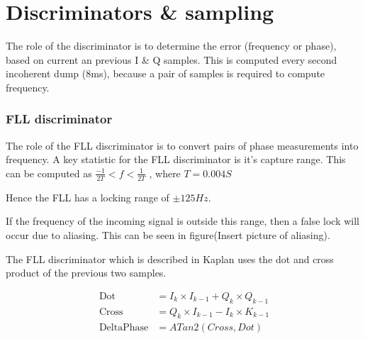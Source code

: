 \chapter{Discriminators \& sampling}
\label{ch:Discriminators}

The role of the discriminator is to determine the error (frequency or phase), based on current an previous I \& Q samples. This is computed every second incoherent dump (8ms), because a pair of samples is required to compute frequency. 







\subsection{FLL discriminator}
The role of the FLL discriminator is to convert pairs of phase measurements into frequency. A key statistic for the FLL discriminator is it's capture range. This can be computed as 
$\frac{-1}{2T} < f < \frac{1}{2T}$
, where $T = 0.004S$

Hence the FLL has a locking range of $\pm 125Hz$. 

If the frequency of the incoming signal is outside this range, then a false lock will occur due to aliasing. This can be seen in figure(Insert picture of aliasing). 

The FLL discriminator which is described in Kaplan uses the dot and cross product of the previous two samples.

\begin{align*}
\text{Dot} &= I_{k}\times I_{k-1} + Q_{k}\times Q_{k-1}\\
\text{Cross} &= Q_{k} \times I_{k-1} - I_{k} \times K_{k-1}\\
\text{DeltaPhase} &= ATan2(Cross,Dot)
\end{align*}
